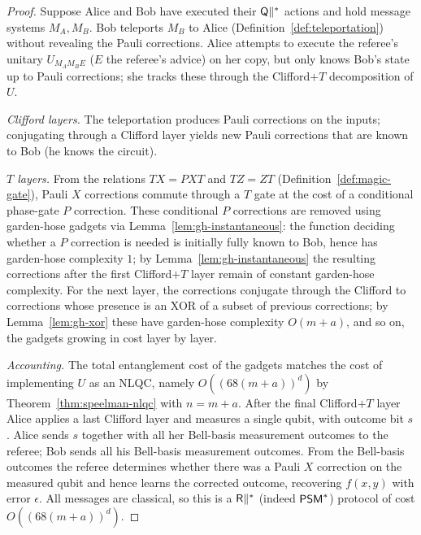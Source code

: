 \begin{proof}
  Suppose Alice and Bob have executed their $\mathsf{Q}\|^{*}$ actions and hold message
  systems $M_A, M_B$. Bob teleports $M_B$ to Alice (Definition~\ref{def:teleportation})
  without revealing the Pauli corrections. Alice attempts to execute the referee's
  unitary $U_{M_A M_B E}$ ($E$ the referee's advice) on her copy, but only knows
  Bob's state up to Pauli corrections; she tracks these through the Clifford$+T$
  decomposition of $U$.

  \emph{Clifford layers.} The teleportation produces Pauli corrections on the
  inputs; conjugating through a Clifford layer yields new Pauli corrections that
  are known to Bob (he knows the circuit).

  \emph{$T$ layers.} From the relations $TX = PXT$ and $TZ = ZT$
  (Definition~\ref{def:magic-gate}), Pauli $X$ corrections commute through a $T$
  gate at the cost of a conditional phase-gate $P$ correction. These conditional
  $P$ corrections are removed using garden-hose gadgets via
  Lemma~\ref{lem:gh-instantaneous}: the function deciding whether a $P$ correction
  is needed is initially fully known to Bob, hence has garden-hose complexity $1$;
  by Lemma~\ref{lem:gh-instantaneous} the resulting corrections after the first
  Clifford$+T$ layer remain of constant garden-hose complexity. For the next
  layer, the corrections conjugate through the Clifford to corrections whose
  presence is an XOR of a subset of previous corrections; by
  Lemma~\ref{lem:gh-xor} these have garden-hose complexity $O(m+a)$, and so on,
  the gadgets growing in cost layer by layer.

  \emph{Accounting.} The total entanglement cost of the gadgets matches the cost
  of implementing $U$ as an NLQC, namely $O((68(m+a))^d)$ by
  Theorem~\ref{thm:speelman-nlqc} with $n = m+a$. After the final Clifford$+T$
  layer Alice applies a last Clifford layer and measures a single qubit, with
  outcome bit $s$. Alice sends $s$ together with all her Bell-basis measurement
  outcomes to the referee; Bob sends all his Bell-basis measurement outcomes. From
  the Bell-basis outcomes the referee determines whether there was a Pauli $X$
  correction on the measured qubit and hence learns the corrected outcome,
  recovering $f(x,y)$ with error $\epsilon$. All messages are classical, so this
  is a $\mathsf{R}\|^{*}$ (indeed $\mathsf{PSM}^{*}$) protocol of cost $O((68(m+a))^d)$.


\end{proof}
